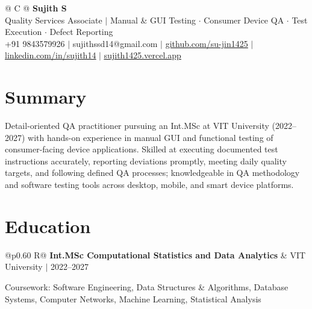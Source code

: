 \documentclass[a4paper,10pt]{article}
\newcommand{\ulink}[2]{\href{#1}{\uline{#2}}}
\newcommand{\subheading}[1]{{\color[HTML]{0A0A0A}\fontsize{12}{14}\selectfont\bfseries #1}}
\newcommand{\meta}[1]{{\color[HTML]{5C5C5C}\fontsize{10.5}{12.5}\selectfont #1}}
\begin{document}
\pagestyle{empty}

\begin{tabularx}{\linewidth}{@{} C @{}}
{\color[HTML]{000000}\fontsize{30}{35}\selectfont\bfseries Sujith S} \\[5pt]
{\fontsize{10.5}{12.5}\selectfont\color[HTML]{3A3A3A}
Quality Services Associate $|$ Manual \& GUI Testing $\cdot$ Consumer Device QA $\cdot$ Test Execution $\cdot$ Defect Reporting} \\[6pt]
{\fontsize{10.5}{12.5}\selectfont\textcolor[HTML]{3A3A3A}{
+91 9843579926 $|$
sujithssd14@gmail.com $|$
\ulink{https://github.com/su-jin1425}{github.com/su-jin1425} $|$
\ulink{https://linkedin.com/in/sujith14}{linkedin.com/in/sujith14} $|$
\ulink{https://sujith1425.vercel.app}{sujith1425.vercel.app}}}
\end{tabularx}

\vspace{2pt}

\section{Summary}
\vspace{3pt}
{\color[HTML]{0A0A0A}\fontsize{11}{14}\selectfont
Detail-oriented QA practitioner pursuing an Int.MSc at VIT University (2022--2027) with hands-on experience in manual GUI and functional testing of consumer-facing device applications. Skilled at executing documented test instructions accurately, reporting deviations promptly, meeting daily quality targets, and following defined QA processes; knowledgeable in QA methodology and software testing tools across desktop, mobile, and smart device platforms.}

\vspace{2pt}

\section{Education}
\vspace{2pt}

\begin{tabularx}{\linewidth}{@{}p{0.60\linewidth} R@{}}
\subheading{Int.MSc Computational Statistics and Data Analytics} & \meta{VIT University $|$ 2022--2027}
\end{tabularx}
\vspace{1pt}
{\color[HTML]{3A3A3A}\fontsize{11}{14}\selectfont Coursework: Software Engineering, Data Structures \& Algorithms, Database Systems, Computer Networks, Machine Learning, Statistical Analysis}
\end{document}
